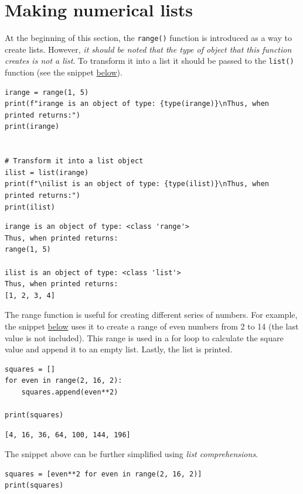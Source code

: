 \documentclass[10pt]{book}
\begin{document}
\section{Making numerical lists}
\label{sec:org1ed979c}
At the beginning of this section, the \texttt{range()} function is introduced as a way to create lists. However, \emph{it should be noted that the type of object that this function creates is not a list}. To transform it into a list it should be passed to the \texttt{list()} function (see the snippet \hyperref[org611169c]{below}).

\label{org611169c}
\begin{verbatim}
irange = range(1, 5)
print(f"irange is an object of type: {type(irange)}\nThus, when printed returns:")
print(irange)


# Transform it into a list object
ilist = list(irange)
print(f"\nilist is an object of type: {type(ilist)}\nThus, when printed returns:")
print(ilist)
\end{verbatim}

\label{orgf2efaa0}
\begin{verbatim}
irange is an object of type: <class 'range'>
Thus, when printed returns:
range(1, 5)

ilist is an object of type: <class 'list'>
Thus, when printed returns:
[1, 2, 3, 4]
\end{verbatim}

The range function is useful for creating different series of numbers. For example, the snippet \hyperref[org05cbdcb]{below} uses it to create a range of even numbers from 2 to 14 (the last value is not included). This range is used in a for loop to calculate the square value and append it to an empty list. Lastly, the list is printed.

\label{org05cbdcb}
\begin{verbatim}
squares = []
for even in range(2, 16, 2):
    squares.append(even**2)

print(squares)
\end{verbatim}

\label{orga54500f}
\begin{verbatim}
[4, 16, 36, 64, 100, 144, 196]
\end{verbatim}

The snippet above can be further simplified using \emph{list comprehensions}.

\label{org9df9a78}
\begin{verbatim}
squares = [even**2 for even in range(2, 16, 2)]
print(squares)
\end{verbatim}
\end{document}
